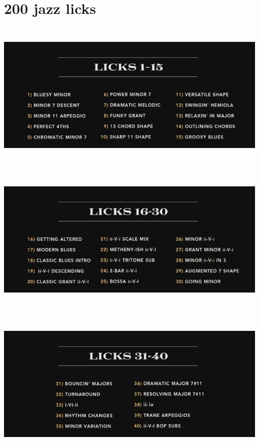 \documentclass[a4paper]{book}
\begin{document}
\clearpage\section[200 jazz licks]{200 jazz licks}
\hypertarget{RefHeadingToc106973218262}{}

\begin{center}
\includegraphics[width=17cm,height=7.177cm]{lebluessupportsmethodes-img31.jpg}
\end{center}


\begin{center}
\includegraphics[width=17cm,height=7.177cm]{lebluessupportsmethodes-img32.jpg}
\end{center}


\begin{center}
\includegraphics[width=17cm,height=7.177cm]{lebluessupportsmethodes-img33.jpg}
\end{center}
\clearpage
\end{document}
